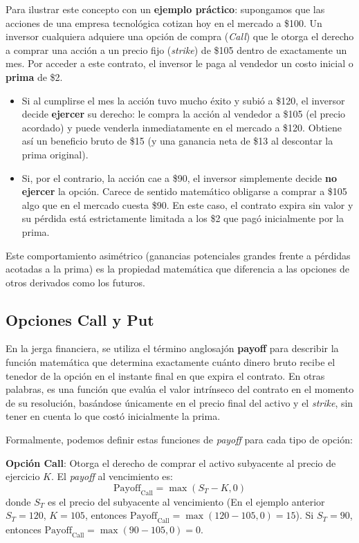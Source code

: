Para ilustrar este concepto con un \textbf{ejemplo práctico}: supongamos que las acciones de una empresa tecnológica cotizan hoy en el mercado a \$100. Un inversor cualquiera adquiere una opción de compra (\textit{Call}) que le otorga el derecho a comprar una acción a un precio fijo (\textit{strike}) de \$105 dentro de exactamente un mes. Por acceder a este contrato, el inversor le paga al vendedor un costo inicial o \textbf{prima} de \$2.
\begin{itemize}
    \item Si al cumplirse el mes la acción tuvo mucho éxito y subió a \$120, el inversor decide \textbf{ejercer} su derecho: le compra la acción al vendedor a \$105 (el precio acordado) y puede venderla inmediatamente en el mercado a \$120. Obtiene así un beneficio bruto de \$15 (y una ganancia neta de \$13 al descontar la prima original).
    \item Si, por el contrario, la acción cae a \$90, el inversor simplemente decide \textbf{no ejercer} la opción. Carece de sentido matemático obligarse a comprar a \$105 algo que en el mercado cuesta \$90. En este caso, el contrato expira sin valor y su pérdida está estrictamente limitada a los \$2 que pagó inicialmente por la prima.
\end{itemize}
Este comportamiento asimétrico (ganancias potenciales grandes frente a pérdidas acotadas a la prima) es la propiedad matemática que diferencia a las opciones de otros derivados como los futuros.

\subsection{Opciones Call y Put}

En la jerga financiera, se utiliza el término anglosajón \textbf{payoff} para describir la función matemática que determina exactamente cuánto dinero bruto recibe el tenedor de la opción en el instante final en que expira el contrato. En otras palabras, es una función que evalúa el valor intrínseco del contrato en el momento de su resolución, basándose únicamente en el precio final del activo y el \textit{strike}, sin tener en cuenta lo que costó inicialmente la prima.

Formalmente, podemos definir estas funciones de \textit{payoff} para cada tipo de opción:

\textbf{Opción Call}: Otorga el derecho de comprar el activo subyacente al precio de ejercicio $K$. El \textit{payoff} al vencimiento es:
\begin{equation}
\text{Payoff}_{\text{Call}} = \max(S_T - K, 0)
\end{equation}
donde $S_T$ es el precio del subyacente al vencimiento (En el ejemplo anterior $S_T = 120$, $K = 105$, entonces $\text{Payoff}_{\text{Call}} = \max(120 - 105, 0) = 15$).
Si $S_T = 90$, entonces $\text{Payoff}_{\text{Call}} = \max(90 - 105, 0) = 0$.

